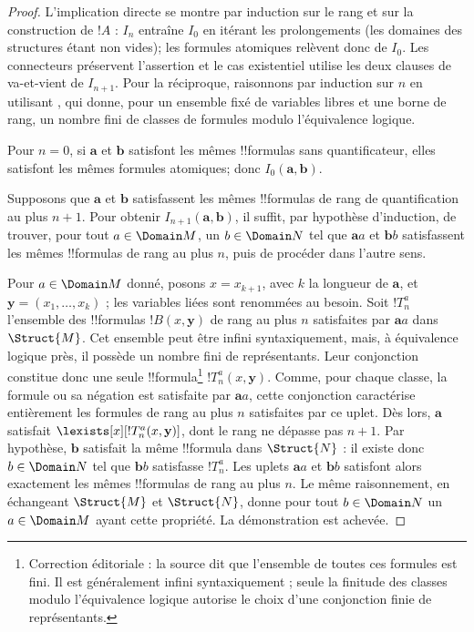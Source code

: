 \documentclass[../../../include/open-logic-section]{subfiles}
\begin{document}
\begin{proof}
  L'implication directe se montre par induction sur le rang
  et sur la construction de $!A$ : $I_n$ entraîne $I_0$
  en itérant les prolongements (les domaines des structures
  étant non vides); les formules atomiques relèvent donc de
  $I_0$. Les connecteurs préservent l'assertion et le cas
  existentiel utilise les deux clauses de va-et-vient de
  $I_{n+1}$.
  Pour la réciproque, raisonnons par induction sur $n$ en
  utilisant , qui donne, pour un
  ensemble fixé de variables libres et une borne de rang,
  un nombre fini de classes de formules modulo
  l'équivalence logique.

  Pour $n=0$, si $\mathbf{a}$ et $\mathbf{b}$ satisfont
  les mêmes !!{formula}s sans quantificateur, elles
  satisfont les mêmes formules atomiques; donc
  $I_0(\mathbf{a},\mathbf{b})$.

  Supposons que $\mathbf{a}$ et $\mathbf{b}$ satisfassent
  les mêmes !!{formula}s de rang de quantification au plus
  $n+1$. Pour obtenir $I_{n+1}(\mathbf{a},\mathbf{b})$,
  il suffit, par hypothèse d'induction, de trouver,
  pour tout $a \in \Domain M$, un $b \in \Domain N$
  tel que $\mathbf{a}a$ et $\mathbf{b}b$ satisfassent
  les mêmes !!{formula}s de rang au plus $n$,
  puis de procéder dans l'autre sens.

  Pour $a \in \Domain M$ donné, posons $x=x_{k+1}$, avec $k$ la longueur de $\mathbf a$, et $\mathbf y=(x_1,\dots,x_k)$ ; les variables liées sont renommées au besoin. Soit $!T^a_n$
  l'ensemble des !!{formula}s $!B(x,\mathbf{y})$
  de rang au plus $n$ satisfaites par
  $\mathbf{a}a$ dans $\Struct{M}$. Cet ensemble peut
  être infini syntaxiquement, mais, à équivalence
  logique près, il possède un nombre fini de représentants.
  Leur conjonction constitue donc une seule !!{formula}\footnote{Correction éditoriale : la source dit que l'ensemble de toutes ces formules est fini. Il est généralement infini syntaxiquement ; seule la finitude des classes modulo l'équivalence logique autorise le choix d'une conjonction finie de représentants.}
  $!T^a_n(x,\mathbf{y})$. Comme, pour chaque classe,
  la formule ou sa négation est satisfaite par
  $\mathbf{a}a$, cette conjonction caractérise
  entièrement les formules de rang au plus $n$
  satisfaites par ce uplet. Dès lors,
  $\mathbf{a}$ satisfait
  $\lexists[x][!T^a_n(x,\mathbf{y})]$,
  dont le rang ne dépasse pas $n+1$.
  Par hypothèse, $\mathbf{b}$ satisfait la même
  !!{formula} dans $\Struct{N}$ : il existe donc
  $b \in \Domain N$ tel que $\mathbf{b}b$ satisfasse
  $!T^a_n$. Les uplets $\mathbf{a}a$ et
  $\mathbf{b}b$ satisfont alors exactement les mêmes
  !!{formula}s de rang au plus $n$.
  Le même raisonnement, en échangeant $\Struct{M}$
  et $\Struct{N}$, donne pour tout $b \in \Domain N$
  un $a\in \Domain M$ ayant cette propriété.
  La démonstration est achevée.
\end{proof}
\end{document}
